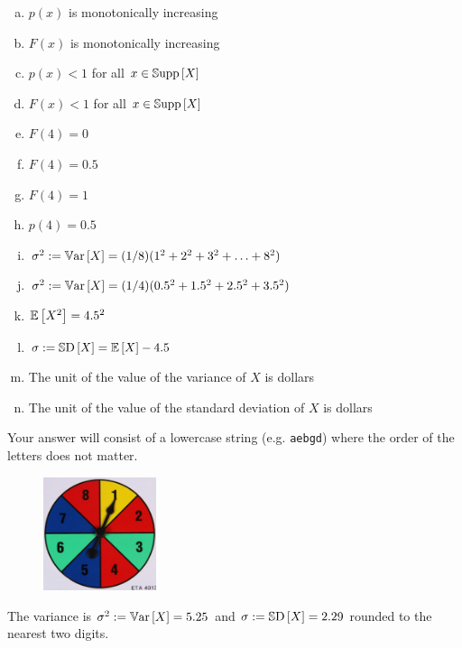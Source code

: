 \documentclass[12pt,landscape]{article}
\newcommand{\instr}{\small Your answer will consist of a lowercase string (e.g. \texttt{aebgd}) where the order of the letters does not matter. \normalsize}
\begin{document}
\vspace{-0.2cm}\benum{} 
\begin{enumerate}[(a)]
\item $p(x)$ is monotonically increasing
\item $F(x)$ is monotonically increasing
\item $p(x) < 1$ for all $x \in \mathbb{S}\text{upp}\left[X\right]$
\item $F(x) < 1$ for all $x \in \mathbb{S}\text{upp}\left[X\right]$
\item $F(4) = 0$
\item $F(4) = 0.5$
\item $F(4) = 1$
\item $p(4) = 0.5$
\item $\sigma^2 := \mathbb{V}\text{ar}\left[X\right] = (1/8) (1^2 + 2^2 + 3^2 + \ldots + 8^2)$
\item $\sigma^2 := \mathbb{V}\text{ar}\left[X\right] = (1/4)(0.5^2 + 1.5^2 + 2.5^2 + 3.5^2)$
\item $\mathbb{E}\left[X^2\right] = 4.5^2$
\item $\sigma := \mathbb{S}\text{D}\left[X\right] = \mathbb{E}\left[X\right] - 4.5$
\item The unit of the value of the variance of $X$ is dollars
\item The unit of the value of the standard deviation of $X$ is dollars
\end{enumerate}
\eenum\instr\pagebreak

\begin{figure}
\includegraphics[width=1.3in]{spinner.png}
\end{figure} \problem{}  The variance is $\sigma^2 := \mathbb{V}\text{ar}\left[X\right] = 5.25$ and $\sigma := \mathbb{S}\text{D}\left[X\right] = 2.29$ rounded to the nearest two digits.
\end{document}
